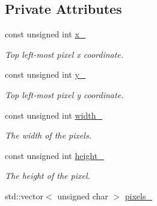 \subsection*{Private Attributes}
\begin{CompactItemize}
\item 
\hypertarget{class_clip_427a67e1feda16230eb9d1d8134ac142}{
const unsigned int \hyperlink{class_clip_427a67e1feda16230eb9d1d8134ac142}{x\_\-}}
\label{class_clip_427a67e1feda16230eb9d1d8134ac142}

\begin{CompactList}\small\item\em Top left-most pixel x coordinate. \item\end{CompactList}\item 
\hypertarget{class_clip_df1fa9449a9457a581d4ac755583af5b}{
const unsigned int \hyperlink{class_clip_df1fa9449a9457a581d4ac755583af5b}{y\_\-}}
\label{class_clip_df1fa9449a9457a581d4ac755583af5b}

\begin{CompactList}\small\item\em Top left-most pixel y coordinate. \item\end{CompactList}\item 
\hypertarget{class_clip_f8547b17e2ad42a17e39b25f7951faaa}{
const unsigned int \hyperlink{class_clip_f8547b17e2ad42a17e39b25f7951faaa}{width\_\-}}
\label{class_clip_f8547b17e2ad42a17e39b25f7951faaa}

\begin{CompactList}\small\item\em The width of the pixels. \item\end{CompactList}\item 
\hypertarget{class_clip_35dd13977f3e15d04053260154ebf42e}{
const unsigned int \hyperlink{class_clip_35dd13977f3e15d04053260154ebf42e}{height\_\-}}
\label{class_clip_35dd13977f3e15d04053260154ebf42e}

\begin{CompactList}\small\item\em The height of the pixel. \item\end{CompactList}\item 
\hypertarget{class_clip_54f166ae724cecf9473d2836b452e89c}{
std::vector$<$ unsigned char $>$ \hyperlink{class_clip_54f166ae724cecf9473d2836b452e89c}{pixels\_\-}}
\label{class_clip_54f166ae724cecf9473d2836b452e89c}


\end{CompactItemize}
